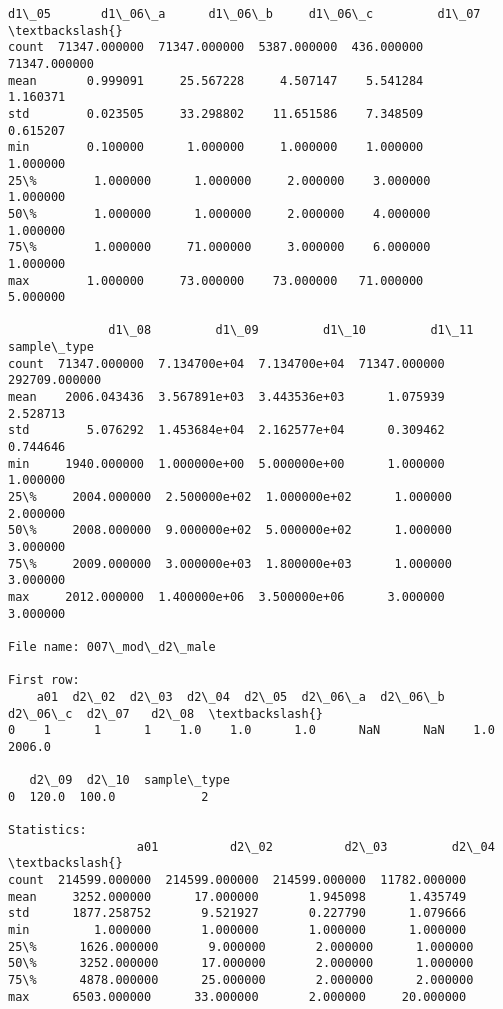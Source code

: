 \documentclass[11pt]{article}
\begin{document}
\begin{Verbatim}[commandchars=\\\{\}]
              d1\_05       d1\_06\_a      d1\_06\_b     d1\_06\_c         d1\_07  \textbackslash{}
count  71347.000000  71347.000000  5387.000000  436.000000  71347.000000   
mean       0.999091     25.567228     4.507147    5.541284      1.160371   
std        0.023505     33.298802    11.651586    7.348509      0.615207   
min        0.100000      1.000000     1.000000    1.000000      1.000000   
25\%        1.000000      1.000000     2.000000    3.000000      1.000000   
50\%        1.000000      1.000000     2.000000    4.000000      1.000000   
75\%        1.000000     71.000000     3.000000    6.000000      1.000000   
max        1.000000     73.000000    73.000000   71.000000      5.000000   

              d1\_08         d1\_09         d1\_10         d1\_11    sample\_type  
count  71347.000000  7.134700e+04  7.134700e+04  71347.000000  292709.000000  
mean    2006.043436  3.567891e+03  3.443536e+03      1.075939       2.528713  
std        5.076292  1.453684e+04  2.162577e+04      0.309462       0.744646  
min     1940.000000  1.000000e+00  5.000000e+00      1.000000       1.000000  
25\%     2004.000000  2.500000e+02  1.000000e+02      1.000000       2.000000  
50\%     2008.000000  9.000000e+02  5.000000e+02      1.000000       3.000000  
75\%     2009.000000  3.000000e+03  1.800000e+03      1.000000       3.000000  
max     2012.000000  1.400000e+06  3.500000e+06      3.000000       3.000000  

File name: 007\_mod\_d2\_male

First row: 
    a01  d2\_02  d2\_03  d2\_04  d2\_05  d2\_06\_a  d2\_06\_b  d2\_06\_c  d2\_07   d2\_08  \textbackslash{}
0    1      1      1    1.0    1.0      1.0      NaN      NaN    1.0  2006.0   

   d2\_09  d2\_10  sample\_type  
0  120.0  100.0            2  

Statistics: 
                  a01          d2\_02          d2\_03         d2\_04  \textbackslash{}
count  214599.000000  214599.000000  214599.000000  11782.000000   
mean     3252.000000      17.000000       1.945098      1.435749   
std      1877.258752       9.521927       0.227790      1.079666   
min         1.000000       1.000000       1.000000      1.000000   
25\%      1626.000000       9.000000       2.000000      1.000000   
50\%      3252.000000      17.000000       2.000000      1.000000   
75\%      4878.000000      25.000000       2.000000      2.000000   
max      6503.000000      33.000000       2.000000     20.000000   


\end{Verbatim}
\end{document}

